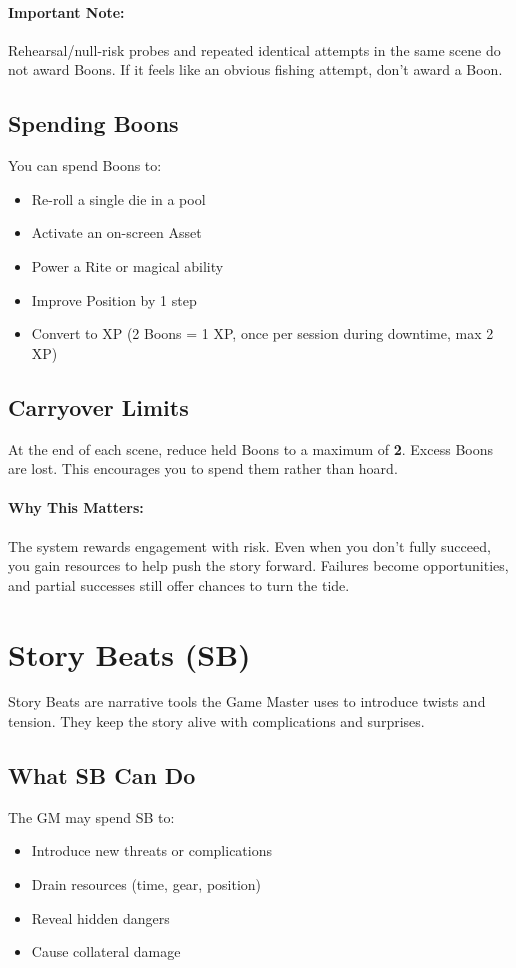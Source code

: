 \paragraph{Important Note:} Rehearsal/null-risk probes and repeated identical attempts in the same scene do not award Boons. If it feels like an obvious fishing attempt, don't award a Boon.

\subsection*{Spending Boons} You can spend Boons to: \begin{itemize} \item Re-roll a single die in a pool \item Activate an on-screen Asset \item Power a Rite or magical ability \item Improve Position by 1 step \item Convert to XP (2 Boons = 1 XP, once per session during downtime, max 2 XP) \end{itemize}

\subsection*{Carryover Limits} At the end of each scene, reduce held Boons to a maximum of \textbf{2}. Excess Boons are lost. This encourages you to spend them rather than hoard.

\paragraph{Why This Matters:}
The system rewards engagement with risk. Even when you don't fully succeed, you gain resources to help push the story forward. Failures become opportunities, and partial successes still offer chances to turn the tide.

\section{Story Beats (SB)} 

Story Beats are narrative tools the Game Master uses to introduce twists and tension. They keep the story alive with complications and surprises.

\subsection*{What SB Can Do}
The GM may spend SB to:
\begin{itemize}
  \item Introduce new threats or complications
  \item Drain resources (time, gear, position)
  \item Reveal hidden dangers
  \item Cause collateral damage
\end{itemize}


